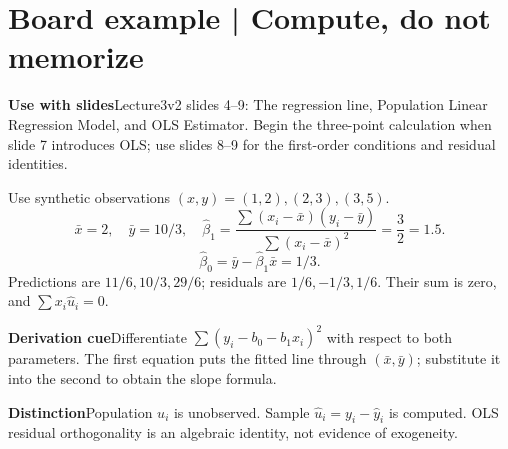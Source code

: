 \documentclass[11pt,a4paper]{article}
\newcommand{\heading}[1]{\section*{\color{accent}#1}}
\newcommand{\cue}[2]{\par\noindent\textbf{#1}\quad #2\par}
\begin{document}
\heading{Board example | Compute, do not memorize}
\cue{Use with slides}{Lecture3v2 slides 4--9: The regression line, Population Linear Regression Model, and OLS Estimator. Begin the three-point calculation when slide 7 introduces OLS; use slides 8--9 for the first-order conditions and residual identities.}
Use synthetic observations $(x,y)=(1,2),(2,3),(3,5)$.
\[
\bar x=2,\quad \bar y=10/3,\quad
\hat\beta_1=\frac{\sum(x_i-\bar x)(y_i-\bar y)}
{\sum(x_i-\bar x)^2}=\frac3{2}=1.5.
\]
\[
\hat\beta_0=\bar y-\hat\beta_1\bar x=1/3.
\]
Predictions are $11/6,10/3,29/6$; residuals are $1/6,-1/3,1/6$. Their sum is zero, and $\sum x_i\hat u_i=0$.
\cue{Derivation cue}{Differentiate $\sum(y_i-b_0-b_1x_i)^2$ with respect to both parameters. The first equation puts the fitted line through $(\bar x,\bar y)$; substitute it into the second to obtain the slope formula.}
\cue{Distinction}{Population $u_i$ is unobserved. Sample $\hat u_i=y_i-\hat y_i$ is computed. OLS residual orthogonality is an algebraic identity, not evidence of exogeneity.}
\end{document}
